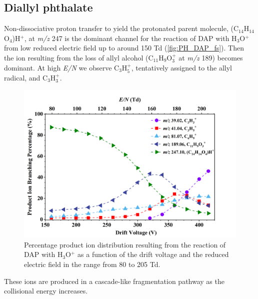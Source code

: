 

\subsection{Diallyl phthalate}
%


Non-dissociative proton transfer to yield the protonated parent molecule, (C$_{14}$H$_{14}$O$_4$)H$^+$, at \textit{m/z} 247 is the dominant channel for the reaction of DAP with H$_3$O$^+$ from low reduced electric field up to around 150 Td (\autoref{fig:PH_DAP_fs}). Then the ion resulting from the loss of allyl alcohol (C$_{11}$H$_9$O$_3^+$ at \textit{m/z} 189) becomes dominant. At high \textit{E/N} we observe C$_3$H$_5^+$, tentatively assigned to  the allyl radical,  and C$_3$H$_3^+$.
%
\begin{figure}[htb]%
\centering
\includegraphics[height=0.4\textheight]{pics/DAP-BR.png}
\caption{Percentage product ion distribution resulting from the reaction of DAP with H$_3$O$^+$ as a function of the drift voltage and the reduced electric field in the range from 80 to 205 Td.}
\label{fig:PH_DAP_fs}
\end{figure}
%
These ions are produced in a cascade-like fragmentation pathway as the collisional energy increases.
